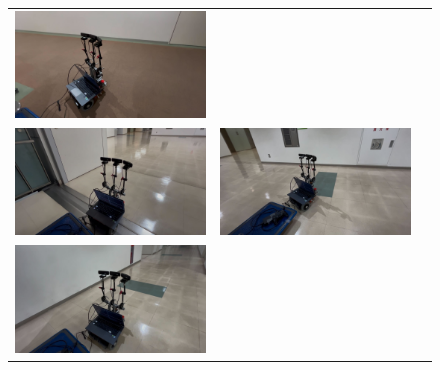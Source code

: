 \begin{figure}[htbp]
\begin{tabular}{ccc}
        \begin{minipage}[t]{0.5\textwidth}
            \centering
            \includegraphics[keepaspectratio, width=70mm]{images/png/ishiguro/exp_3.png}
        \end{minipage} \\
        \begin{minipage}[t]{0.5\textwidth}
            \centering
            \includegraphics[keepaspectratio, width=70mm]{images/png/ishiguro/exp_4.png}
        \end{minipage} &
        \begin{minipage}[t]{0.5\textwidth}
            \centering
            \includegraphics[keepaspectratio, width=70mm]{images/png/ishiguro/exp_5.png}
        \end{minipage} \\
        \begin{minipage}[t]{0.5\textwidth}
            \centering
            \includegraphics[keepaspectratio, width=70mm]{images/png/ishiguro/exp_6.png}

\end{minipage}
\end{tabular}
\end{figure}

